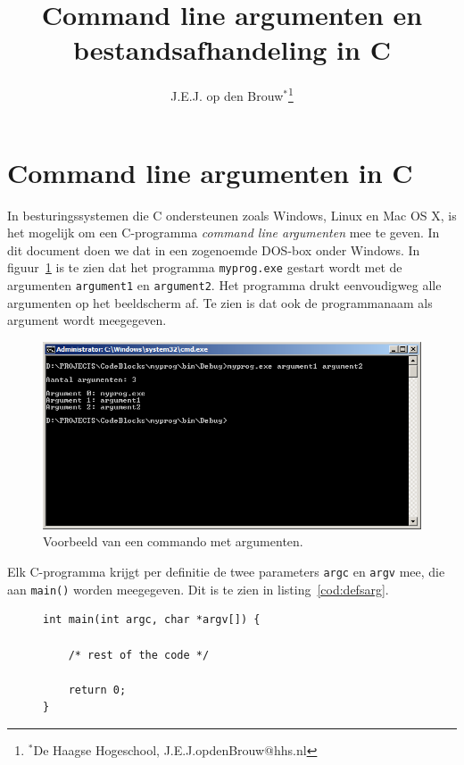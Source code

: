 \documentclass[a4paper,12pt,twoside]{article}
\author{J.E.J. op den Brouw$^*$\thanks{$^*$De Haagse Hogeschool, J.E.J.opdenBrouw@hhs.nl}}
\title{Command line argumenten en bestandsafhandeling in C}
\begin{document}
\maketitle

\section{Command line argumenten in C}
In besturingssystemen die C ondersteunen zoals Windows, Linux en Mac OS X, 
is het mogelijk om een C-programma \textsl{command line argumenten} mee te geven. In
dit document doen we dat in een zogenoemde DOS-box onder Windows. In figuur~\ref{fig:vbarg}
is te zien dat het programma \lstinline|myprog.exe| gestart wordt met de argumenten
\lstinline|argument1| en \lstinline|argument2|. Het programma drukt eenvoudigweg alle
argumenten op het beeldscherm af. Te zien is dat ook de programmanaam als argument
wordt meegegeven.

\begin{figure}[!ht]
\centering
\includegraphics[width=\textwidth]{myprog.png}
\caption{Voorbeeld van een commando met argumenten.}
\label{fig:vbarg}
\end{figure}


Elk C-programma krijgt per definitie de twee parameters \lstinline|argc| en \lstinline|argv|
mee, die aan \lstinline|main()|
worden meegegeven. Dit is te zien in listing~\ref{cod:defsarg}.

\begin{figure}[!ht]
\begin{lstlisting}[caption=Declaratie van de command line parameters.,label=cod:defsarg]
int main(int argc, char *argv[]) {

    /* rest of the code */
    
    return 0;
}
\end{lstlisting}
\end{figure}
\end{document}
